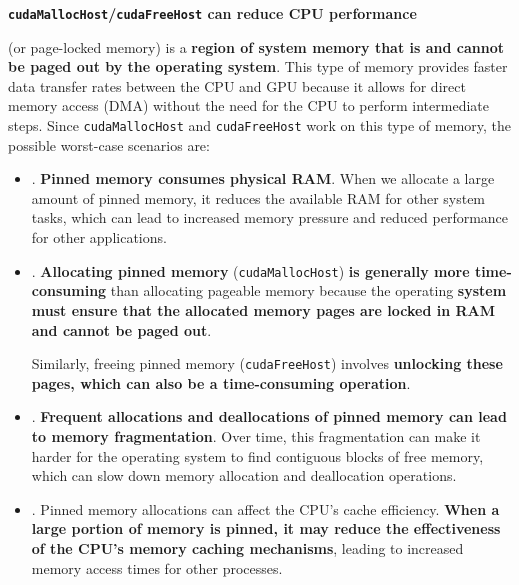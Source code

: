 \begin{flushleft}
    \textcolor{Red2}{ \textbf{\texttt{cudaMallocHost}/\texttt{cudaFreeHost} can reduce CPU performance}}
\end{flushleft}
 (or page-locked memory) is a \textbf{region of system memory that is  and cannot be paged out by the operating system}. This type of memory provides faster data transfer rates between the CPU and GPU because it allows for direct memory access (DMA) without the need for the CPU to perform intermediate steps. Since \texttt{cudaMallocHost} and \texttt{cudaFreeHost} work on this type of memory, the possible worst-case scenarios are:
\begin{itemize}
    \item[\textcolor{Red2}{\faIcon{times}}] . \textbf{Pinned memory consumes physical RAM}. When we allocate a large amount of pinned memory, it reduces the available RAM for other system tasks, which can lead to increased memory pressure and reduced performance for other applications.


    \item[\textcolor{Red2}{\faIcon{times}}] . \textbf{Allocating pinned memory} (\texttt{cudaMallocHost}) \textbf{is generally more time-consuming} than allocating pageable memory because the operating \textbf{system must ensure that the allocated memory pages are locked in RAM and cannot be paged out}.
    
    Similarly, freeing pinned memory (\texttt{cudaFreeHost}) involves \textbf{unlocking these pages, which can also be a time-consuming operation}.


    \item[\textcolor{Red2}{\faIcon{times}}] . \textbf{Frequent allocations and deallocations of pinned memory can lead to memory fragmentation}. Over time, this fragmentation can make it harder for the operating system to find contiguous blocks of free memory, which can slow down memory allocation and deallocation operations.


    \item[\textcolor{Red2}{\faIcon{times}}] . Pinned memory allocations can affect the CPU's cache efficiency. \textbf{When a large portion of memory is pinned, it may reduce the effectiveness of the CPU's memory caching mechanisms}, leading to increased memory access times for other processes.
\end{itemize}
